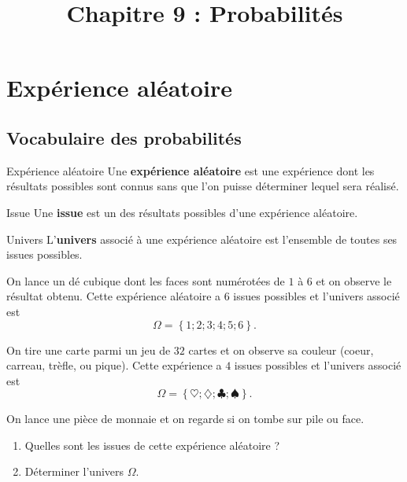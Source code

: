 \documentclass[11pt]{article}
\title{Chapitre 9 : Probabilités}
\date{}
\author{}
\begin{document}
\maketitle\thispagestyle{fancy}


\section{Expérience aléatoire}
\subsection{Vocabulaire des probabilités}

\begin{defi}{Expérience aléatoire}
  Une \textbf{expérience aléatoire} est une expérience dont les résultats
  possibles sont connus sans que l'on puisse déterminer lequel sera réalisé.
\end{defi}

\begin{defi}{Issue}
  Une \textbf{issue} est un des résultats possibles d'une expérience aléatoire.
\end{defi}

\begin{defi}{Univers}
  L'\textbf{univers} associé à une expérience aléatoire est l'ensemble de toutes
  ses issues possibles.
\end{defi}

\begin{exemple}
  On lance un dé cubique dont les faces sont numérotées de $1$ à $6$ et on
  observe le résultat obtenu. Cette expérience aléatoire a $6$ issues possibles
  et l'univers associé est
  \[
    \Omega = \left\{ 1; 2; 3; 4; 5; 6 \right\}.
  \]
\end{exemple}

\begin{exemple}
  On tire une carte parmi un jeu de $32$ cartes et on observe sa couleur (coeur,
  carreau, trèfle, ou pique). Cette expérience a $4$ issues possibles et
  l'univers associé est
  \[
    \Omega = \left\{ \heartsuit; \diamondsuit; \clubsuit; \spadesuit \right\}.
  \]
\end{exemple}

\begin{app}
  On lance une pièce de monnaie et on regarde si on tombe sur pile ou face.
  \begin{enumerate}
    \item Quelles sont les issues de cette expérience aléatoire ?
    \item Déterminer l'univers $\Omega$.
  \end{enumerate}
\end{app}
\end{document}
